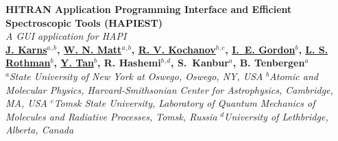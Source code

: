 \documentclass[a0,landscape]{a0poster}
\begin{document}


\begin{minipage}[b]{0.78\linewidth}
\VeryHuge \color{NavyBlue} \textbf{HITRAN Application Programming Interface and Efficient Spectroscopic Tools (HAPIEST)}\\[0.1cm]%
\color{Black}\LARGE\textit{A GUI application for HAPI}\\[1.5cm] %
\LARGE\textbf{\underline{J. Karns}$^a$$^,$$^b$, \underline{W. N. Matt}$^a$$^,$$^b$, \underline{R. V. Kochanov}$^b$$^,$$^c$, \underline{I.~E. Gordon}$^b$, \underline{L. S. Rothman}$^b$, \underline{Y. Tan}$^b$, R. Hashemi$^b$$^,$$^d$, S.~Kanbur$^a$, B. Tenbergen$^a$}\\[0.5cm] %
\large $^a$\textit{State University of New York at Oswego, Oswego, NY, USA}
\large $^b$\textit{Atomic and Molecular Physics, Harvard-Smithsonian Center for Astrophysics, Cambridge, MA, USA}
\large $^c$\textit{Tomsk State University, Laboratory of Quantum Mechanics of Molecules and Radiative Processes, Tomsk, Russia}
\large $^d$\textit{University of Lethbridge, Alberta, Canada}
\end{minipage}
%
\end{document}
